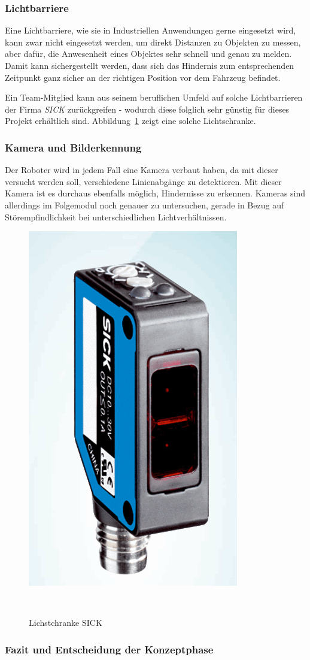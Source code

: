 \documentclass[main.tex]{subfiles} %
\begin{document}
\subsubsection*{Lichtbarriere}
Eine Lichtbarriere, wie sie in Industriellen Anwendungen gerne eingesetzt wird,
kann zwar nicht eingesetzt werden, um direkt Distanzen zu Objekten zu messen, aber dafür,
die Anwesenheit eines Objektes sehr schnell und genau zu melden. Damit kann sichergestellt werden, dass sich das Hindernis zum entsprechenden Zeitpunkt ganz sicher an der richtigen Position vor dem Fahrzeug befindet.

Ein Team-Mitglied kann aus seinem beruflichen Umfeld auf solche Lichtbarrieren
der Firma \textit{SICK} zurückgreifen - wodurch diese folglich sehr günstig für
dieses Projekt erhältlich sind. Abbildung~\ref{fig:SICK_Sensor} zeigt eine
solche Lichtschranke.

\subsubsection*{Kamera und Bilderkennung}
Der Roboter wird in jedem Fall eine Kamera verbaut haben, da mit dieser
versucht werden soll, verschiedene Linienabgänge zu detektieren. Mit dieser Kamera
ist es durchaus ebenfalls möglich, Hindernisse zu erkennen. Kameras sind allerdings im Folgemodul noch
genauer zu untersuchen, gerade in Bezug auf Störempfindlichkeit bei unterschiedlichen Lichtverhältnissen.

\begin{figure}[h!]
    \centering
    \includegraphics[width=0.25\linewidth]{./fig_Hinderniserkennung/SICK_Lichtschranke.png}
    \caption{Lichstchranke SICK}~\label{fig:SICK_Sensor}
\end{figure}

\subsubsection*{Fazit und Entscheidung der Konzeptphase}
\end{document}
